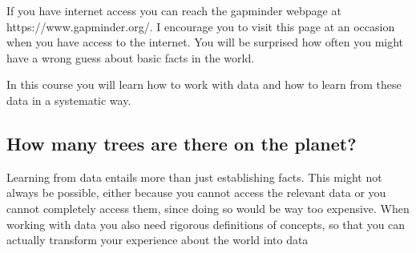 \documentclass[
  letterpaper,
]{scrbook}
\begin{document}
\begin{tcolorbox}[enhanced jigsaw, toprule=.15mm, colbacktitle=quarto-callout-tip-color!10!white, breakable, coltitle=black, rightrule=.15mm, bottomtitle=1mm, bottomrule=.15mm, titlerule=0mm, title=\textcolor{quarto-callout-tip-color}{\faLightbulb}\hspace{0.5em}{The gapminder webpage}, arc=.35mm, leftrule=.75mm, toptitle=1mm, left=2mm, opacityback=0, opacitybacktitle=0.6, colframe=quarto-callout-tip-color-frame, colback=white]
If you have internet access you can reach the gapminder webpage at
https://www.gapminder.org/. I encourage you to visit this page at an
occasion when you have access to the internet. You will be surprised how
often you might have a wrong guess about basic facts in the
world.
\end{tcolorbox}

In this course you will learn how to work with data and how to learn
from these data in a systematic way.

\hypertarget{how-many-trees-are-there-on-the-planet}{%
\subsection{How many trees are there on the
planet?}\label{how-many-trees-are-there-on-the-planet}}

Learning from data entails more than just establishing facts. This might
not always be possible, either because you cannot access the relevant
data or you cannot completely access them, since doing so would be way
too expensive. When working with data you also need rigorous definitions
of concepts, so that you can actually transform your experience about
the world into data
\end{document}

